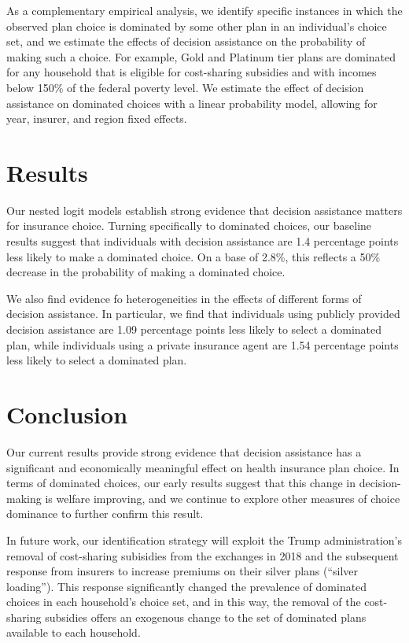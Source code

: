 \documentclass[
  12pt,
]{article}
\begin{document}
As a complementary empirical analysis, we identify specific instances in which the observed plan choice is dominated by some other plan in an individual's choice set, and we estimate the effects of decision assistance on the probability of making such a choice. For example, Gold and Platinum tier plans are dominated for any household that is eligible for cost-sharing subsidies and with incomes below 150\% of the federal poverty level. We estimate the effect of decision assistance on dominated choices with a linear probability model, allowing for year, insurer, and region fixed effects.

\hypertarget{results}{%
\section{Results}\label{results}}

Our nested logit models establish strong evidence that decision assistance matters for insurance choice. Turning specifically to dominated choices, our baseline results suggest that individuals with decision assistance are 1.4 percentage points less likely to make a dominated choice. On a base of 2.8\%, this reflects a 50\% decrease in the probability of making a dominated choice.

We also find evidence fo heterogeneities in the effects of different forms of decision assistance. In particular, we find that individuals using publicly provided decision assistance are 1.09 percentage points less likely to select a dominated plan, while individuals using a private insurance agent are 1.54 percentage points less likely to select a dominated plan.

\hypertarget{conclusion}{%
\section{Conclusion}\label{conclusion}}

Our current results provide strong evidence that decision assistance has a significant and economically meaningful effect on health insurance plan choice. In terms of dominated choices, our early results suggest that this change in decision-making is welfare improving, and we continue to explore other measures of choice dominance to further confirm this result.

In future work, our identification strategy will exploit the Trump administration's removal of cost-sharing subisidies from the exchanges in 2018 and the subsequent response from insurers to increase premiums on their silver plans (``silver loading''). This response significantly changed the prevalence of dominated choices in each household's choice set, and in this way, the removal of the cost-sharing subsidies offers an exogenous change to the set of dominated plans available to each household.
\end{document}
